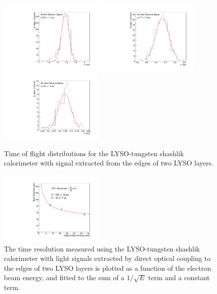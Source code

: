 \documentclass[12pt]{article}
\begin{document}
\begin{figure}[H] \centering
\includegraphics[width=0.45\textwidth]{figs/TOF_ShashlikSideReadout_Electron_8GeV} 
\includegraphics[width=0.45\textwidth]{figs/TOF_ShashlikSideReadout_Electron_16GeV} 
\includegraphics[width=0.45\textwidth]{figs/TOF_ShashlikSideReadout_Electron_32GeV} 
\caption{ Time of flight distributions for the LYSO-tungsten shashlik calorimeter
with signal extracted from the edges of two LYSO layers. } 
\label{fig:ShashlikSideReadoutTOF}
\end{figure}

\begin{figure}[H] \centering
\includegraphics[width=0.45\textwidth]{figs/TimeResolutionVsEnergy_ShashlikSideReadout} 
\caption{ The time resolution measured using the LYSO-tungsten shashlik calorimeter
with light signals extracted by direct optical coupling to the edges of two LYSO layers 
is plotted as a function of the electron beam energy, and fitted to the sum 
of a $1/\sqrt{E}$ term and a constant term. }
\label{fig:ShashlikSideReadoutTOFResolutionVsEnergy}
\end{figure}
\end{document}
